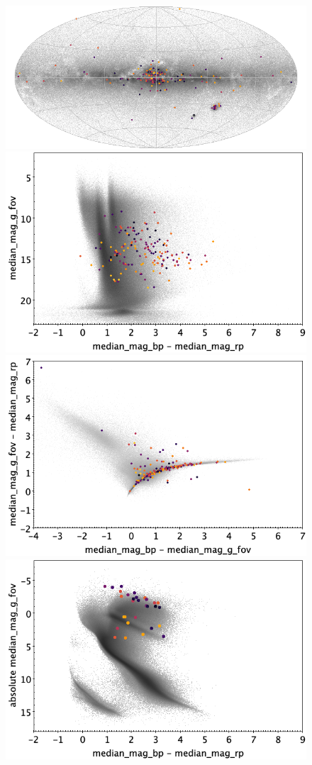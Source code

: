 \documentclass[longauth]{aa}
\begin{document}
\begin{appendix}
\begin{figure}
\centering
{}
\includegraphics[width=0.6\hsize]{figures/appendix/RCB_cls_sky.png} 
 \\ %
\vspace{4mm}
 \includegraphics[width=0.45\hsize]{figures/appendix/RCB_cls_cm.png}  %
\hspace{2mm}
 \includegraphics[width=0.45\hsize]{figures/appendix/RCB_cls_cc.png} \\ %
\vspace{4mm}
 \includegraphics[width=0.45\hsize]{figures/appendix/RCB_cls_cam.png}  %

\end{figure}
\end{appendix}
\end{document}
